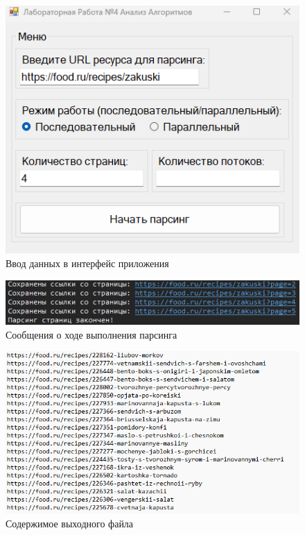 \begin{figure}[]
	\centering
	\includegraphics[scale=0.8]{img/1-prog.png}
	\caption{Ввод данных в интерфейс приложения}
	\label{fig:1-prog}
\end{figure}
\begin{figure}[]
	\centering
	\includegraphics[scale=0.8]{img/2-prog.png}
	\caption{Сообщения о ходе выполнения парсинга}
	\label{fig:2-prog}
\end{figure}

\begin{figure}[]
	\centering
	\includegraphics[scale=0.8]{img/5-outputfile.png}
	\caption{Содержимое выходного файла}
	\label{fig:5-out}
\end{figure}

